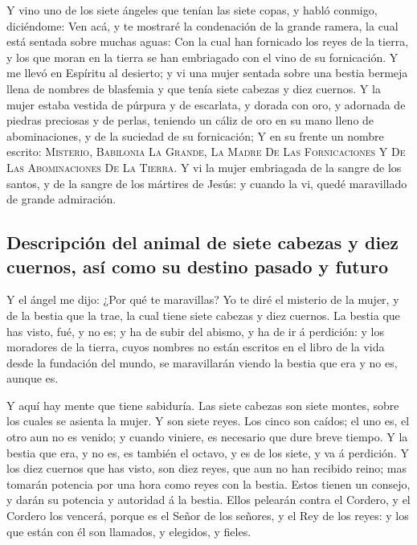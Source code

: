  Y vino uno de los siete ángeles que tenían las siete
copas, y habló conmigo, diciéndome: Ven acá, y te mostraré la
condenación de la grande ramera, la cual está sentada sobre muchas
aguas:  Con la cual han fornicado los reyes de la tierra,
y los que moran en la tierra se han embriagado con el vino de su
fornicación.  Y me llevó en Espíritu al desierto; y vi una
mujer sentada sobre una bestia bermeja llena de nombres de blasfemia y
que tenía siete cabezas y diez cuernos.  Y la mujer estaba
vestida de púrpura y de escarlata, y dorada con oro, y adornada de
piedras preciosas y de perlas, teniendo un cáliz de oro en su mano lleno
de abominaciones, y de la suciedad de su fornicación;  Y
en su frente un nombre escrito: \textsc{Misterio}, \textsc{Babilonia}
\textsc{La} \textsc{Grande}, \textsc{La} \textsc{Madre} \textsc{De}
\textsc{Las} \textsc{Fornicaciones} Y \textsc{De} \textsc{Las}
\textsc{Abominaciones} \textsc{De} \textsc{La} \textsc{Tierra}.
 Y vi la mujer embriagada de la sangre de los santos, y de
la sangre de los mártires de Jesús: y cuando la vi, quedé maravillado de
grande admiración.

\hypertarget{descripciuxf3n-del-animal-de-siete-cabezas-y-diez-cuernos-asuxed-como-su-destino-pasado-y-futuro}{%
\subsection{Descripción del animal de siete cabezas y diez cuernos, así
como su destino pasado y
futuro}\label{descripciuxf3n-del-animal-de-siete-cabezas-y-diez-cuernos-asuxed-como-su-destino-pasado-y-futuro}}

 Y el ángel me dijo: ¿Por qué te maravillas? Yo te diré el
misterio de la mujer, y de la bestia que la trae, la cual tiene siete
cabezas y diez cuernos.  La bestia que has visto, fué, y
no es; y ha de subir del abismo, y ha de ir á perdición: y los moradores
de la tierra, cuyos nombres no están escritos en el libro de la vida
desde la fundación del mundo, se maravillarán viendo la bestia que era y
no es, aunque es.

 Y aquí hay mente que tiene sabiduría. Las siete cabezas
son siete montes, sobre los cuales se asienta la mujer. 
Y son siete reyes. Los cinco son caídos; el uno es, el otro aun no es
venido; y cuando viniere, es necesario que dure breve tiempo.
 Y la bestia que era, y no es, es también el octavo, y es
de los siete, y va á perdición.  Y los diez cuernos que
has visto, son diez reyes, que aun no han recibido reino; mas tomarán
potencia por una hora como reyes con la bestia.  Estos
tienen un consejo, y darán su potencia y autoridad á la bestia.
 Ellos pelearán contra el Cordero, y el Cordero los
vencerá, porque es el Señor de los señores, y el Rey de los reyes: y los
que están con él son llamados, y elegidos, y fieles.

